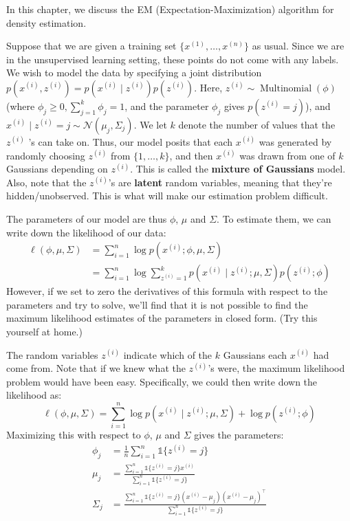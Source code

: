 \vspace{1cm}
\begin{fullwidth}
\label{cha:gmm}
\end{fullwidth}
In this chapter, we discuss the EM (Expectation-Maximization) algorithm %
for density estimation.

Suppose that we are given a training set $\{x^{(1)},\ldots,x^{(n)}\}$ as usual. Since
we are in the unsupervised learning setting, these points do not come with
any labels.
We wish to model the data by specifying a joint distribution $p(x^{(i)} ,z^{(i)} ) =
p(x^{(i)} \mid z^{(i)} )p(z^{(i)} )$. Here, $z^{(i)} \sim \operatorname{Multinomial}(\phi)$ (where $\phi_j \ge 0,
\sum^k_{j=1} \phi_j = 1$,
and the parameter $\phi_j$ gives $p(z^{(i)} = j)$), and $x^{(i)} \mid z^{(i)} = j \sim \mathcal N(\mu_j ,\Sigma_j )$. We
let $k$ denote the number of values that the $z^{(i)}$ 's can take on. Thus, our
model posits that each $x^{(i)}$ was generated by randomly choosing $z^{(i)}$ from
$\{1,\ldots,k\}$, and then $x^{(i)}$ was drawn from one of $k$ Gaussians depending on
$z^{(i)}$. This is called the \textbf{mixture of Gaussians} model. Also, note that the
$z^{(i)}$'s are \textbf{latent} random variables, meaning that they're hidden/unobserved.
This is what will make our estimation problem difficult.

The parameters of our model are thus $\phi$, $\mu$ and $\Sigma$. To estimate them, we
can write down the likelihood of our data:
\begin{align*}
    \ell(\phi,\mu,\Sigma) &= \sum^n_{i=1} \log p(x^{(i)} ;\phi,\mu,\Sigma)\\
        &= \sum^n_{i=1} \log \sum^k_{z^{(i)} = 1} p(x^{(i)} \mid z^{(i)} ;\mu,\Sigma)p(z^{(i)} ;\phi)
\end{align*}
However, if we set to zero the derivatives of this formula with respect to
the parameters and try to solve, we'll find that it is not possible to find the
maximum likelihood estimates of the parameters in closed form. (Try this
yourself at home.)

The random variables $z^{(i)}$ indicate which of the $k$ Gaussians each $x^{(i)}$
had come from. Note that if we knew what the $z^{(i)}$'s were, the maximum
likelihood problem would have been easy. Specifically, we could then write
down the likelihood as:
\begin{equation*}
    \ell(\phi,\mu,\Sigma) = \sum_{i=1}^n \log p(x^{(i)} \mid z^{(i)} ;\mu,\Sigma) + \log p(z^{(i)} ;\phi)
\end{equation*}
Maximizing this with respect to $\phi$, $\mu$ and $\Sigma$ gives the parameters:
\begin{align*}
    \phi_j &= \frac{1}{n} \sum_{i=1}^n \mathbb{1}\{z^{(i)} = j\}\\
    \mu_j &= \frac{\sum^n_{i=1} \mathbb{1}\{z^{(i)} = j\}x^{(i)}}{\sum^n_{i=1} \mathbb{1}\{z^{(i)} = j\}}\\
    \Sigma_j &= \frac{\sum^n_{i=1} \mathbb{1}\{z^{(i)} = j\}(x^{(i)} - \mu_j)(x^{(i)} - \mu_j)^\top}{\sum^n_{i=1} \mathbb{1}\{z^{(i)} = j\}}
\end{align*}

